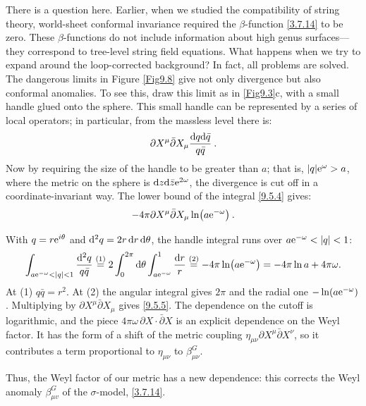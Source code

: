 There is a question here. Earlier, when we studied the compatibility of string theory, world-sheet conformal invariance required the $\beta$-function \eqref{3.7.14} to be zero. 
These $\beta$-functions do not include information about high genus surfaces—they correspond to tree-level string field equations. What happens when we try to expand around the loop-corrected background? 
In fact, all problems are solved. The dangerous limits in Figure \ref{Fig9.8} give not only divergence but also conformal anomalies.
To see this, 
draw this limit as in \ref{Fig9.3}c, with a small handle glued onto the sphere. This small handle can be represented by a series of local operators; in particular, from the massless level there is:
\begin{equation}
	\partial X^{\mu} \bar{\partial} X_{\mu} \frac{\mathrm{d} q \mathrm{d} \bar{q}}{q \bar{q}} \:. \label{9.5.4}
\end{equation}
Now by requiring the size of the handle to be greater than $a$; that is, $|q|
\mathrm{e}^{\omega}>a$, where the metric on the sphere is $\mathrm{d} z \mathrm{d} \bar{z} \mathrm{e}^{2 \omega}$,  
the divergence is cut off in a coordinate-invariant way. The lower bound of the integral \eqref{9.5.4} gives:
\begin{equation}
	-4 \pi \partial X^{\mu} \bar{\partial} X_{\mu} \ln (a \mathrm{e}^{-\omega}) \:.
	\label{9.5.5}
\end{equation}
\begin{tcolorbox}[breakable]
	\begin{remark}
		With $q=r\mathrm{e}^{i\theta}$ and $\mathrm{d}^2q=2r\,\mathrm{d} r\,\mathrm{d}\theta$, the handle integral runs over $a\me^{-\omega}<|q|<1$:
		\begin{equation*}
			\int_{a\me^{-\omega}<|q|<1}\frac{\dif^2q}{q\bar q}\eqs{1}2\int_0^{2\pi}\dif\theta\int_{a\me^{-\omega}}^1\frac{\dif r}{r}\eqs{2}-4\pi\ln\bigl(a\me^{-\omega}\bigr)=-4\pi\ln a+4\pi\omega .
		\end{equation*}
		At (1) $q\bar q=r^2$. At (2) the angular integral gives $2\pi$ and the radial one $-\ln(a\mathrm{e}^{-\omega})$. Multiplying by $\partial X^\mu\bar\partial X_\mu$ gives \eqref{9.5.5}. The dependence on the cutoff is logarithmic, and the piece $4\pi\omega\,\partial X\cdot\bar\partial X$ is an explicit dependence on the Weyl factor. It has the form of a shift of the metric coupling $\eta_{\mu\nu}\partial X^\mu\bar\partial X^\nu$, so it contributes a term proportional to $\eta_{\mu\nu}$ to $\beta^G_{\mu\nu}$.
	\end{remark}
\end{tcolorbox}
Thus, the Weyl factor of our metric has a new dependence: this corrects the Weyl anomaly $\beta_{\mu v}^{G}$ of the $\sigma$-model, \eqref{3.7.14}. 

